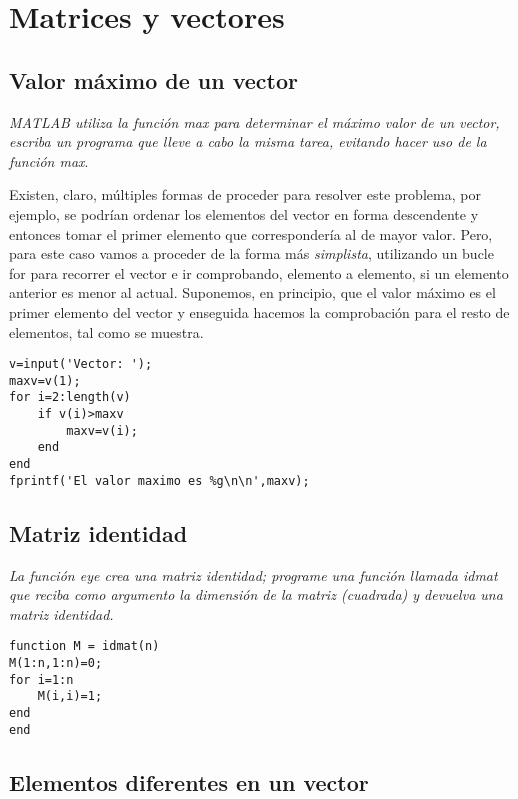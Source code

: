 \chapter{Matrices y vectores}

\section{Valor máximo de un vector}

\textit{MATLAB utiliza la función max para determinar el máximo valor de un vector, escriba un programa 
que lleve a cabo la misma tarea, evitando hacer uso de la función max}.

\sol

Existen, claro, múltiples formas de proceder para resolver este problema, por ejemplo, se podrían 
ordenar los elementos del vector en forma descendente y entonces tomar el primer elemento que 
correspondería al de mayor valor. Pero, para este caso vamos a proceder de la forma más \textit{simplista}, 
utilizando un bucle for para recorrer el vector e ir comprobando, elemento a elemento, si un elemento 
anterior es menor al actual. Suponemos, en principio, que el valor máximo es el primer elemento del vector 
y enseguida hacemos la comprobación para el resto de elementos, tal como se muestra.

\begin{verbatim}
v=input('Vector: ');
maxv=v(1);
for i=2:length(v)
    if v(i)>maxv
        maxv=v(i);
    end
end
fprintf('El valor maximo es %g\n\n',maxv);
\end{verbatim}

\section{Matriz identidad}

\textit{La función eye crea una matriz identidad; programe una función llamada idmat que reciba 
como argumento la dimensión de la matriz (cuadrada) y devuelva una matriz identidad.}

\sol

\begin{verbatim}
function M = idmat(n)
M(1:n,1:n)=0;
for i=1:n
    M(i,i)=1;
end
end
\end{verbatim}


\section{Elementos diferentes en un vector}

